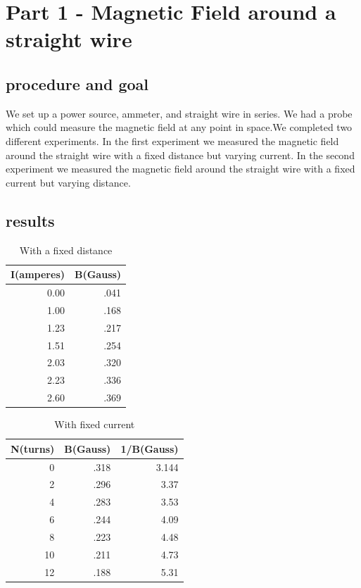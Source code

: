\documentclass[12pt]{article}
\begin{document}
\section*{Part 1 -  Magnetic Field around a straight wire}
\subsection*{procedure and goal}

We set up a power source, ammeter, and straight wire in series. We had a probe which could measure the magnetic field at any point in space.We completed two different experiments. In the first experiment we measured the magnetic field around the straight wire with a fixed distance but varying current. In the second experiment we measured the magnetic field around the straight wire with a fixed current but varying distance.  

\subsection*{results}
	
	\begin{table}[hp]
	\caption{With a fixed distance}
	\centering
	\begin{tabular}{|r|r|}
	\hline 
	I(amperes) & B(Gauss) \\
	\hline 
	0.00 & .041 \\
	1.00 & .168 \\
	1.23 & .217 \\
	1.51 & .254 \\
	2.03 & .320 \\
	2.23 & .336 \\
	2.60 & .369 \\
	\hline
	\end{tabular}
	\end{table}

	\begin{table}[hp] 
	\caption{With fixed current}
	\centering
	\begin{tabular}{|r|r|r|}
	\hline 
	N(turns) & B(Gauss) & 1/B(Gauss) \\
	\hline 
	0 & .318 & 3.144 \\
	2 & .296 & 3.37 \\
	4 & .283 & 3.53 \\
	6 & .244 & 4.09\\
	8 & .223 & 4.48 \\
	10 & .211 & 4.73 \\
	12 & .188  & 5.31\\
	\hline
	\end{tabular}
	\end{table}
\end{document}
